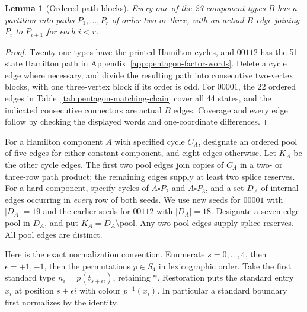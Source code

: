 \documentclass[11pt]{article}
\newtheorem{lemma}[theorem]{Lemma}
\theoremstyle{remark}
\numberwithin{equation}{section}
\numberwithin{table}{section}
\begin{document}
\begin{lemma}[Ordered path blocks]\label{lem:pentagon-path-blocks}
Every one of the 23 component types $B$ has a partition into paths
$P_1,\ldots,P_r$ of order two or three, with an actual $B$ edge
joining $P_i$ to $P_{i+1}$ for each $i<r$.
\end{lemma}
\begin{proof}
Twenty-one types have the printed Hamilton cycles, and $00112$ has
the 51-state Hamilton path in Appendix~\ref{app:pentagon-factor-words}.
Delete a cycle edge where necessary, and divide the resulting path
into consecutive two-vertex blocks, with one three-vertex block if
its order is odd. For $00001$, the 22 ordered edges in
Table~\ref{tab:pentagon-matching-chain} cover all 44 states, and the
indicated consecutive connectors are actual $B$ edges. Coverage and
every edge follow by checking the displayed words and one-coordinate
differences.
\end{proof}

For a Hamilton component $A$ with specified cycle $C_A$, designate an
ordered pool of five edges for either constant component, and eight
edges otherwise. Let $K_A$ be the other cycle edges. The first two
pool edges join copies of $C_A$ in a two- or three-row path product;
the remaining edges supply at least two splice reserves.
For a hard component, specify cycles of $A\square P_2$ and
$A\square P_3$, and a set $D_A$ of internal edges occurring in
\emph{every} row of both seeds. We use new seeds for $00001$ with
$|D_A|=19$ and the earlier seeds for $00112$ with $|D_A|=18$.
Designate a seven-edge pool in $D_A$, and put $K_A=D_A\setminus
\text{pool}$. Any two pool edges supply splice reserves. All pool edges are distinct.

Here is the exact normalization convention. Enumerate $s=0,\ldots,4$,
then $\epsilon=+1,-1$, then the permutations $p\in S_4$ in lexicographic
order. Take the first standard type
$n_i=p(t_{s+\epsilon i})$, retaining $\ast$. Restoration puts the
standard entry $x_i$ at position $s+\epsilon i$ with colour $p^{-1}(x_i)$.
In particular a standard boundary first normalizes by the identity.
\end{document}
